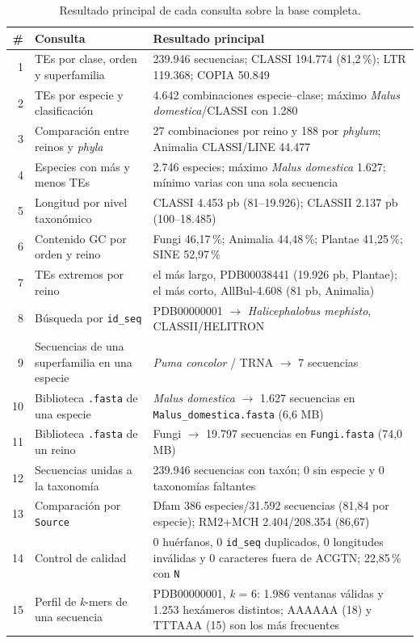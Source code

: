 \documentclass[journal]{IEEEtran}
\begin{document}
\begin{table}[t]
\caption{Resultado principal de cada consulta sobre la base completa.}
\label{tab:consultas}
\centering
\footnotesize
\begin{tabularx}{\textwidth}{@{}r >{\raggedright\arraybackslash}p{3.3cm} X@{}}
\toprule
\# & Consulta & Resultado principal \\
\midrule
1 & TEs por clase, orden y superfamilia & 239.946 secuencias; CLASSI 194.774 (81,2\,\%); LTR 119.368; COPIA 50.849 \\
2 & TEs por especie y clasificación & 4.642 combinaciones especie--clase; máximo \textit{Malus domestica}/CLASSI con 1.280 \\
3 & Comparación entre reinos y \textit{phyla} & 27 combinaciones por reino y 188 por \textit{phylum}; Animalia CLASSI/LINE 44.477 \\
4 & Especies con más y menos TEs & 2.746 especies; máximo \textit{Malus domestica} 1.627; mínimo varias con una sola secuencia \\
5 & Longitud por nivel taxonómico & CLASSI 4.453 pb (81--19.926); CLASSII 2.137 pb (100--18.485) \\
6 & Contenido GC por orden y reino & Fungi 46,17\,\%; Animalia 44,48\,\%; Plantae 41,25\,\%; SINE 52,97\,\% \\
7 & TEs extremos por reino & el más largo, PDB00038441 (19.926 pb, Plantae); el más corto, AllBul-4.608 (81 pb, Animalia) \\
8 & Búsqueda por \texttt{id\_seq} & PDB00000001 $\rightarrow$ \textit{Halicephalobus mephisto}, CLASSII/HELITRON \\
9 & Secuencias de una superfamilia en una especie & \textit{Puma concolor} / TRNA $\rightarrow$ 7 secuencias \\
10 & Biblioteca \texttt{.fasta} de una especie & \textit{Malus domestica} $\rightarrow$ 1.627 secuencias en \texttt{Malus\_domestica.fasta} (6,6 MB) \\
11 & Biblioteca \texttt{.fasta} de un reino & Fungi $\rightarrow$ 19.797 secuencias en \texttt{Fungi.fasta} (74,0 MB) \\
12 & Secuencias unidas a la taxonomía & 239.946 secuencias con taxón; 0 sin especie y 0 taxonomías faltantes \\
13 & Comparación por \texttt{Source} & Dfam 386 especies/31.592 secuencias (81,84 por especie); RM2+MCH 2.404/208.354 (86,67) \\
14 & Control de calidad & 0 huérfanos, 0 \texttt{id\_seq} duplicados, 0 longitudes inválidas y 0 caracteres fuera de ACGTN; 22,85\,\% con \texttt{N} \\
15 & Perfil de \textit{k}-mers de una secuencia & PDB00000001, \textit{k} = 6: 1.986 ventanas válidas y 1.253 hexámeros distintos; AAAAAA (18) y TTTAAA (15) son los más frecuentes \\
\bottomrule
\end{tabularx}
\end{table}
\end{document}
